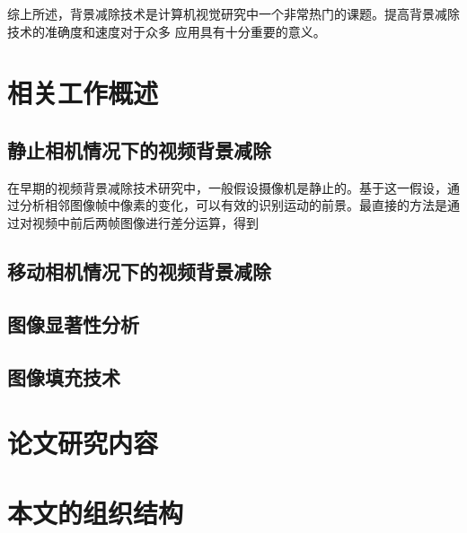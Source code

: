 \par
综上所述，背景减除技术是计算机视觉研究中一个非常热门的课题。提高背景减除技术的准确度和速度对于众多
应用具有十分重要的意义。
\section{相关工作概述}
\label{sec:second}

\subsection{静止相机情况下的视频背景减除}
\label{sec:staticCamera}
在早期的视频背景减除技术研究中，一般假设摄像机是静止的。基于这一假设，通过分析相邻图像帧中像素的变化，可以有效的识别运动的前景。最直接的方法是通过对视频中前后两帧图像进行差分运算，得到

\subsection{移动相机情况下的视频背景减除}
\label{sec:movingCamera}

\subsection{图像显著性分析}
\label{sec:imageSaliency}


\subsection{图像填充技术}
\label{sec:imageInpainting}

\section{论文研究内容}
\label{sec:contents}


\section{本文的组织结构}
\label{sec:hierarchy} 